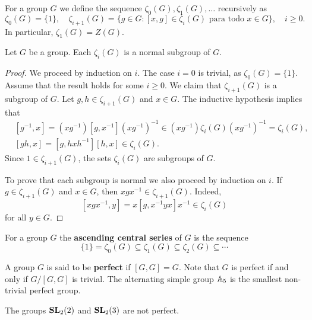 For a group $G$ we define the sequence $\zeta_0(G),\zeta_1(G),\dots$
recursively as 
\[
	\zeta_0(G)=\{1\},\quad
	\zeta_{i+1}(G)=\{g\in G:[x,g]\in\zeta_{i}(G)\text{ para todo $x\in G$}\},\quad i\geq 0.
\]
In particular, $\zeta_1(G)=Z(G)$.

\begin{lemma}
	\label{lem:central_ascendente}
	Let $G$ be a group. Each $\zeta_i(G)$ is a normal
	subgroup of $G$. 
\end{lemma}

\begin{proof}
	We proceed by induction on $i$. The case $i=0$ is trivial, as 
	$\zeta_0(G)=\{1\}$.  Assume that the result holds for some $i\geq0$.
	We claim that $\zeta_{i+1}(G)$ is a subgroup of $G$. 
	Let $g,h\in \zeta_{i+1}(G)$ and $x\in G$. The inductive hypothesis implies that 
	\begin{align*}
	&[g^{-1},x]=(xg^{-1})[g,x^{-1}](xg^{-1})^{-1}\in (xg^{-1})\zeta_i(G)(xg^{-1})^{-1}=\zeta_i(G),\\
	&[gh,x]=[g,hxh^{-1}][h,x]\in \zeta_{i}(G).
	\end{align*}
	Since $1\in\zeta_{i+1}(G)$, the sets $\zeta_i(G)$ are subgroups of $G$. 
	
	To prove 
	that each subgroup is normal we also proceed by induction on $i$. 
	If $g\in\zeta_{i+1}(G)$ and $x\in G$, then $xgx^{-1}\in\zeta_{i+1}(G)$. Indeed,  
	\[
	[xgx^{-1},y]=x[g,x^{-1}yx]x^{-1}\in\zeta_{i}(G)
	\]
	for all $y\in G$.
\end{proof}


For a group $G$ the \textbf{ascending central series} of $G$ is the sequence 
\[
	\{1\}=\zeta_0(G)\subseteq\zeta_1(G)\subseteq\zeta_2(G)\subseteq\cdots
\]

A group $G$ is said to be \textbf{perfect} if $[G,G]=G$. Note that
$G$ is perfect if and only if $G/[G,G]$ is trivial. The alternating 
simple group $\mathbb{A}_5$ is the smallest non-trivial perfect group. 

\begin{example}
The groups $\mathbf{SL}_2(2)$ and $\mathbf{SL}_2(3)$ are not perfect. 	
\end{example}

